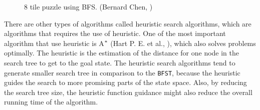 \iftrue
\begin{landscape}
\begin{figure}[htb]

\resizebox{\dimexpr\linewidth-1cm}{!}{%
\begin{forest}
[\usebox\myboxbfsone
  [\usebox\myboxbfstwo
	[\usebox\myboxbfsfive
		[\usebox\myboxbfsten
			[\usebox\myboxbfstwenty
				[\usebox\myboxbfsthirtyfour]
				[\usebox\myboxbfsthirtyfive]			
			]		
		]
		[\usebox\myboxbfseleven
			[\usebox\myboxbfstwentyone
				[\usebox\myboxbfsthirtysix]
				[\usebox\myboxbfsthirtyseven]			
			]
			[\usebox\myboxbfstwentytwo
				[\usebox\myboxbfsthirtyeight]
				[\usebox\myboxbfsthirtynine]			
			]
			[\usebox\myboxbfstwentythree
				[\usebox\myboxbfsforty]
				[\usebox\myboxbfsfortyone]			
			]		
		]	
	]  
  ]
  [\usebox\myboxbfsthree
	[\usebox\myboxbfssix
		[\usebox\myboxbfstwelve
			[\usebox\myboxbfstwentyfour
				[\usebox\myboxbfsfortytwo]
				[\usebox\myboxbfsfortythree]			
			]		
		]
		[\usebox\myboxbfsthirteen
			[\usebox\myboxbfstwentyfive
				[\usebox\myboxbfsfortyfour]
				[\usebox\myboxbfsfortyfive]			
			]		
		]	
	]
	[\usebox\myboxbfsseven
		[\usebox\myboxbfsfourteen
			[\usebox\myboxbfstwentysix
				[\usebox\myboxbfsfortysix]			
			]		
		]
		[\usebox\myboxbfsfifteen
			[\usebox\myboxbfstwentyseven]		
		]	
	]
	[\usebox\myboxbfseight
		[\usebox\myboxbfssixteen
			[\usebox\myboxbfstwentyeight]		
		]
		[\usebox\myboxbfsseventeen
			[\usebox\myboxbfstwentynine]		
		]	
	]  
  ]
  [\usebox\myboxbfsfour
	[\usebox\myboxbfsnine
		[\usebox\myboxbfseighteen
			[\usebox\myboxbfsthirty]
			[\usebox\myboxbfsthirtyone]
			[\usebox\myboxbfsthirtytwo]
		]
		[\usebox\myboxbfsnineteen
			[\usebox\myboxbfsthirtythree]		
		]
	]  
  ]
]
\end{forest}
}
\caption{8 tile puzzle using BFS. (Bernard Chen, \citeyear{bernard2011})} \label{fig:bfs_solution}
\end{figure}
\end{landscape}
\fi

There are other types of algorithms called heuristic search algorithms, which are algorithms that requires the use of heuristic. One of the most important algorithm that use heuristic is A$\sp{*}$ (Hart P. E. et al., \citeyear{hart1968formal}), which also solves problems optimally. The heuristic is the estimation of the distance for one node in the search tree to get to the goal state. The heuristic search algorithms tend to generate smaller search tree in comparison to the \texttt{BFST}, because the heuristic guides the search to more promising parts of the state space. Also, by reducing the search tree size, the heuristic function guidance might also reduce the overall running time of the algorithm.

